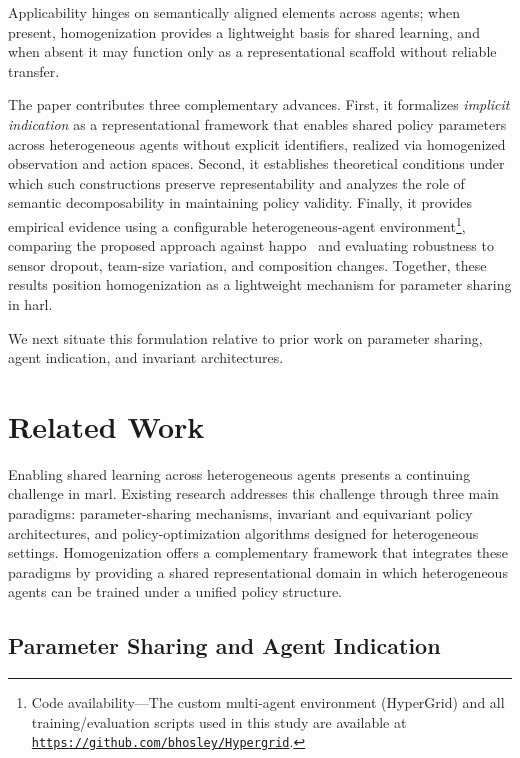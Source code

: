 Applicability hinges on semantically aligned elements across agents; when present, 
homogenization provides a lightweight basis for shared learning, and when 
absent it may function only as a representational scaffold without reliable transfer.

The paper contributes three complementary advances. 
First, it formalizes \emph{implicit indication} as a representational framework that enables
shared policy parameters across heterogeneous agents without explicit identifiers, realized
via homogenized observation and action spaces.
Second, it establishes theoretical conditions under which such constructions preserve 
representability and analyzes the role of semantic decomposability in maintaining policy validity. 
Finally, it provides empirical evidence using a configurable heterogeneous-agent 
environment\footnote{
    Code availability---The custom multi-agent environment (HyperGrid) 
    and all training/evaluation scripts used in this study are available at 
    \href{https://github.com/bhosley/Hypergrid}{\texttt{https://github.com/bhosley/Hypergrid}}.
}, 
comparing the proposed approach against \gls{happo}~\cite{zhong2024} and 
evaluating robustness to sensor dropout, team-size variation, and composition changes. 
Together, these results position homogenization as a lightweight mechanism 
for parameter sharing in \gls{harl}.

We next situate this formulation relative to prior work on parameter sharing, 
agent indication, and invariant architectures.


\section{Related Work}
\label{con2:sec:related_work}

Enabling shared learning across heterogeneous agents 
presents a continuing challenge in \gls{marl}.
Existing research addresses this challenge through three main paradigms: 
parameter-sharing mechanisms, invariant and equivariant policy architectures, 
and policy-optimization algorithms designed for heterogeneous settings. 
Homogenization offers a complementary framework that integrates these 
paradigms by providing a shared representational domain in which 
heterogeneous agents can be trained under a unified policy structure.

\subsection{Parameter Sharing and Agent Indication}


